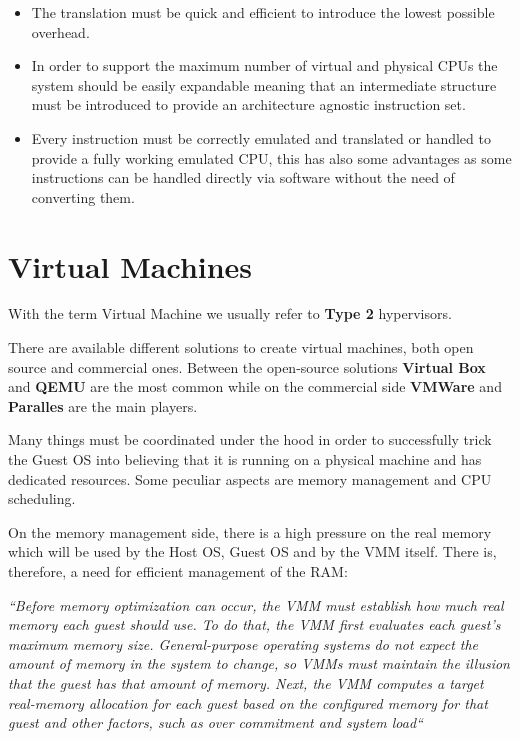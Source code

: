 \begin{itemize}
    \item The translation must be quick and efficient to introduce the lowest possible overhead.
    \item In order to support the maximum number of virtual and physical CPUs the system should be easily expandable meaning that an intermediate structure must be introduced to provide an architecture agnostic instruction set.
    \item Every instruction must be correctly emulated and translated or handled to provide a fully working emulated CPU, this has also some advantages as some instructions can be handled directly via software without the need of converting them.
\end{itemize}

\section{Virtual Machines}

With the term Virtual Machine we usually refer to \textbf{Type 2} hypervisors.

There are available different solutions to create virtual machines, both open source and commercial ones. Between the open-source solutions \textbf{Virtual Box} and \textbf{QEMU} are the most common while on the commercial side \textbf{VMWare} and \textbf{Paralles} are the main players. 

Many things must be coordinated under the hood in order to successfully trick the Guest OS into believing that it is running on a physical machine and has dedicated resources. Some peculiar aspects are memory management and CPU scheduling.

On the memory management side, there is a high pressure on the real memory which will be used by the Host OS, Guest OS and by the VMM itself. There is, therefore, a need for efficient management of the RAM:

\textit{``Before memory optimization can occur, the VMM must establish how much real memory each guest should use. To do that, the VMM first evaluates each guest’s maximum memory size. General-purpose operating systems do not expect the amount of memory in the system to change, so VMMs must maintain the illusion that the guest has that amount of memory. Next, the VMM computes a target real-memory allocation for each guest based on the configured memory for that guest and other factors, such as over commitment and system load``}~\cite{os}


